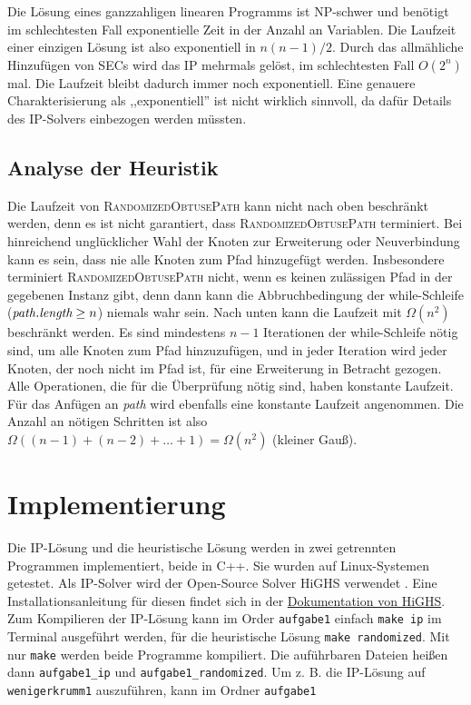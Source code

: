 \documentclass[a4paper, 10pt, ngerman]{article}
\begin{document}
Die Lösung eines ganzzahligen linearen Programms ist NP-schwer und benötigt im schlechtesten Fall exponentielle Zeit in der Anzahl an Variablen. Die Laufzeit einer einzigen Lösung ist also exponentiell in $n(n-1)/2$. Durch das allmähliche Hinzufügen von SECs wird das IP mehrmals gelöst, im schlechtesten Fall $O(2^n)$ mal. Die Laufzeit bleibt dadurch immer noch exponentiell. Eine genauere Charakterisierung als ,,exponentiell'' ist nicht wirklich sinnvoll, da dafür Details des IP-Solvers einbezogen werden müssten.

\subsection{Analyse der Heuristik}

Die Laufzeit von \textsc{RandomizedObtusePath} kann nicht nach oben beschränkt werden, denn es ist nicht garantiert, dass \textsc{RandomizedObtusePath} terminiert. Bei hinreichend unglücklicher Wahl der Knoten zur Erweiterung oder Neuverbindung kann es sein, dass nie alle Knoten zum Pfad hinzugefügt werden. Insbesondere terminiert \textsc{RandomizedObtusePath} nicht, wenn es keinen zulässigen Pfad in der gegebenen Instanz gibt, denn dann kann die Abbruchbedingung der while-Schleife ($\emph{path.length} \ge n$) niemals wahr sein. Nach unten kann die Laufzeit mit $\Omega(n^2)$ beschränkt werden. Es sind mindestens $n - 1$ Iterationen der while-Schleife nötig sind, um alle Knoten zum Pfad hinzuzufügen, und in jeder Iteration wird jeder Knoten, der noch nicht im Pfad ist, für eine Erweiterung in Betracht gezogen. Alle Operationen, die für die Überprüfung nötig sind, haben konstante Laufzeit. Für das Anfügen an \emph{path} wird ebenfalls eine konstante Laufzeit angenommen. Die Anzahl an nötigen Schritten ist also $\Omega((n - 1) + (n - 2) + \dots + 1) = \Omega(n^2)$ (kleiner Gauß).

\section{Implementierung}

Die IP-Lösung und die heuristische Lösung werden in zwei getrennten Programmen implementiert, beide in C++. Sie wurden auf Linux-Systemen getestet. Als IP-Solver wird der Open-Source Solver HiGHS verwendet \cite{highs}. Eine Installationsanleitung für diesen findet sich in der \href{https://ergo-code.github.io/HiGHS/dev/cpp/get-started/}{Dokumentation von HiGHS}. Zum Kompilieren der IP-Lösung kann im Order \verb|aufgabe1| einfach \verb|make ip| im Terminal ausgeführt werden, für die heuristische Lösung \verb|make randomized|. Mit nur \verb|make| werden beide Programme kompiliert. Die auführbaren Dateien heißen dann \verb|aufgabe1_ip| und \verb|aufgabe1_randomized|. Um z. B. die IP-Lösung auf \verb|wenigerkrumm1| auszuführen, kann im Ordner \verb|aufgabe1|
\end{document}
